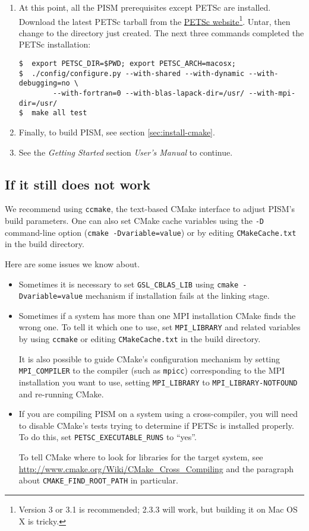 \documentclass[11pt,final]{amsart}
\begin{document}
\begin{enumerate}
\item At this point, all the PISM prerequisites except PETSc are installed. Download the latest PETSc tarball from the
  \href{http://www.mcs.anl.gov/petsc/petsc-as/}{PETSc website}\footnote{Version 3 or 3.1 is recommended; 2.3.3 will work, but building it on Mac OS X is tricky.}. Untar, then change to the directory just created.
The next three commands completed the PETSc installation:
\begin{verbatim}
$  export PETSC_DIR=$PWD; export PETSC_ARCH=macosx;
$  ./config/configure.py --with-shared --with-dynamic --with-debugging=no \
        --with-fortran=0 --with-blas-lapack-dir=/usr/ --with-mpi-dir=/usr/
$  make all test
\end{verbatim}
\item Finally, to build PISM, see section \ref{sec:install-cmake}.

\item See the \emph{Getting Started} section \emph{User's Manual} to continue.
\end{enumerate}

\clearpage
\subsection{If it still does not work}
\label{subsec:config}

We recommend using \texttt{ccmake}, the text-based CMake interface to adjust PISM's build parameters. One can also set CMake cache
variables using the \texttt{-D} command-line option (\texttt{cmake -Dvariable=value}) or by editing \texttt{CMakeCache.txt} in the
build directory.

Here are some issues we know about.
\begin{itemize}
\item Sometimes it is necessary to set \texttt{GSL_CBLAS_LIB} using \texttt{cmake -Dvariable=value} mechanism if installation
  fails at the linking stage.
\item Sometimes if a system has more than one MPI installation CMake finds the wrong one. To tell it which one to use, set
  \texttt{MPI_LIBRARY} and related variables by using \texttt{ccmake} or editing \texttt{CMakeCache.txt} in the build directory.

  It is also possible to guide CMake's configuration mechanism by setting \texttt{MPI_COMPILER} to the compiler (such as
  \texttt{mpicc}) corresponding to the MPI installation you want to use, setting \texttt{MPI_LIBRARY} to
  \texttt{MPI_LIBRARY-NOTFOUND} and re-running CMake.
\item If you are compiling PISM on a system using a cross-compiler, you will need to disable CMake's tests trying to determine if
  PETSc is installed properly. To do this, set \texttt{PETSC_EXECUTABLE_RUNS} to ``yes''.

  To tell CMake where to look for libraries for the target system, see \url{http://www.cmake.org/Wiki/CMake_Cross_Compiling} and
  the paragraph about \texttt{CMAKE_FIND_ROOT_PATH} in particular.
\end{itemize}
\end{document}
